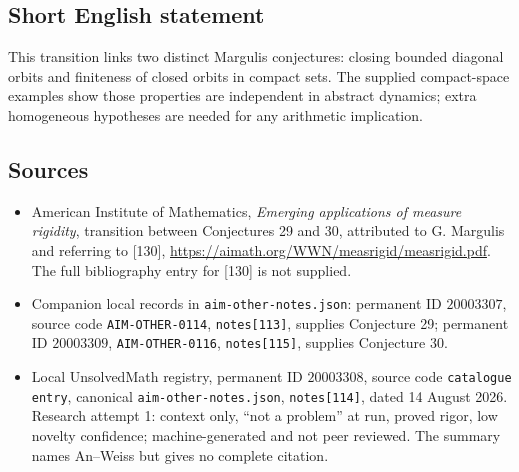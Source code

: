 \documentclass[11pt]{article}
\begin{document}
\subsection{Short English statement}
This transition links two distinct Margulis conjectures: closing bounded diagonal orbits and finiteness of closed orbits in compact sets. The supplied compact-space examples show those properties are independent in abstract dynamics; extra homogeneous hypotheses are needed for any arithmetic implication.
\subsection{Sources}
\begin{itemize}
\item American Institute of Mathematics, \emph{Emerging applications of measure rigidity}, transition between Conjectures 29 and 30, attributed to G. Margulis and referring to [130], \url{https://aimath.org/WWN/measrigid/measrigid.pdf}. The full bibliography entry for [130] is not supplied.
\item Companion local records in \texttt{aim-other-notes.json}: permanent ID $20003307$, source code \texttt{AIM-OTHER-0114}, \texttt{notes[113]}, supplies Conjecture 29; permanent ID $20003309$, \texttt{AIM-OTHER-0116}, \texttt{notes[115]}, supplies Conjecture 30.
\item Local UnsolvedMath registry, permanent ID $20003308$, source code \texttt{catalogue entry}, canonical \texttt{aim-other-notes.json}, \texttt{notes[114]}, dated 14 August 2026. Research attempt 1: context only, ``not a problem'' at run, proved rigor, low novelty confidence; machine-generated and not peer reviewed. The summary names An--Weiss but gives no complete citation.
\end{itemize}
\end{document}
